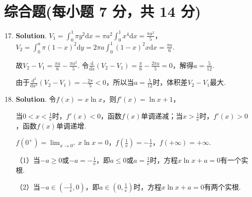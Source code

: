\documentclass[../Main.tex]{subfiles}
\begin{document}
\section{综合题(每小题 7 分，共 14 分)}
\begin{enumerate}
    \setcounter{enumi}{16}
    \item \textbf{Solution}. $V_{1} = \int_{0}^{1}\pi y^{2} \mathrm{d}x = \pi
              a^{2}\int_{0}^{1}x^{4} \mathrm{d}x = \frac{\pi a^{2}}{5}$，$V_{2} = \int_{0}
              ^{a}\pi (1-x)^{2} \mathrm{d}y = 2\pi a \int_{0}^{1}(1-x)^{2} x \mathrm{d}x =
              \frac{\pi a}{6}$.

          故$V_{2} - V_{1} = \frac{\pi a}{6}- \frac{\pi a^{2}}{5}$. 令$\frac{\mathrm{d}}{\mathrm{d}
                  a}(V_{2} - V_{1}) = \frac{\pi}{6}- \frac{2\pi a}{5}= 0$，解得$a=\frac{5}{12}$.

          由于$\frac{\mathrm{d}^{2}}{\mathrm{d}a^{2}}(V_{2} - V_{1}) = -\frac{2\pi}{5}
              < 0$，所以当$a=\frac{5}{12}$时，体积差$V_{2} - V_{1}$最大.

    \item \textbf{Solution}. 令$f(x)=x\ln x$，则$f'(x)=\ln x + 1$，

          当$0<x<\frac{1}{\mathrm{e}}$时，$f'(x)<0$，函数$f(x)$单调递减；当$x>\frac{1}{\mathrm{e}}$时，$f
              '(x)>0$，函数$f(x)$单调递增.

          $f(0^{+}) = \lim_{x\to0^+}x\ln x = 0$，$f\left(\frac{1}{\mathrm{e}}\right) =
              -\frac{1}{\mathrm{e}}$，$f(+\infty) = +\infty$.

          （1）当$-a\geq0$或$-a = -\frac{1}{\mathrm{e}}$，即$a\leq0$或$a = \frac{1}{\mathrm{e}}$时，方程$x
              \ln x + a = 0$有一个实根.

          （2）当$-a\in\left(-\frac{1}{\mathrm{e}},0\right)$，即$a\in\left(0,\frac{1}{\mathrm{e}}
              \right)$时，方程$x\ln x + a = 0$有两个实根.
\end{enumerate}
\end{document}

